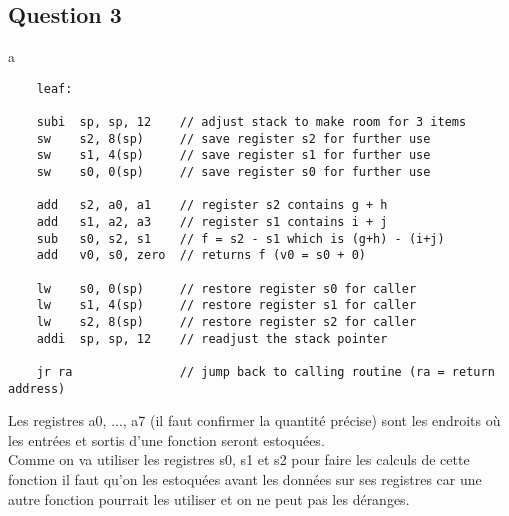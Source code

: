 \documentclass{article}
\begin{document}
\newpage\subsection*{Question 3}
\begin{resolution}
    a
    \begin{scriptsize}
        \myRISCV
        \begin{lstlisting}
    leaf:
    
    subi  sp, sp, 12    // adjust stack to make room for 3 items
    sw    s2, 8(sp)     // save register s2 for further use
    sw    s1, 4(sp)     // save register s1 for further use
    sw    s0, 0(sp)     // save register s0 for further use
    
    add   s2, a0, a1    // register s2 contains g + h
    add   s1, a2, a3    // register s1 contains i + j
    sub   s0, s2, s1    // f = s2 - s1 which is (g+h) - (i+j)
    add   v0, s0, zero  // returns f (v0 = s0 + 0)
    
    lw    s0, 0(sp)     // restore register s0 for caller
    lw    s1, 4(sp)     // restore register s1 for caller
    lw    s2, 8(sp)     // restore register s2 for caller
    addi  sp, sp, 12    // readjust the stack pointer

    jr ra               // jump back to calling routine (ra = return address)
        \end{lstlisting}
    \end{scriptsize}
    Les registres a0, ..., a7 (il faut confirmer la quantité précise) sont les endroits où les entrées et sortis d'une fonction seront estoquées.\\

    Comme on va utiliser les registres s0, s1 et s2 pour faire les calculs de cette fonction il faut qu'on les estoquées avant les données sur ses registres car une autre fonction pourrait les utiliser et on ne peut pas les déranges.
\end{resolution}
\end{document}
